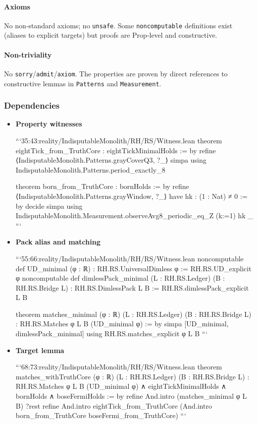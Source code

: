 \documentclass{article}
\begin{document}
\paragraph{Axioms}
No non‑standard axioms; no \texttt{unsafe}. Some \texttt{noncomputable} definitions exist (aliases to explicit targets) but proofs are Prop‑level and constructive.

\paragraph{Non-triviality}
No \texttt{sorry}/\texttt{admit}/\texttt{axiom}. The properties are proven by direct references to constructive lemmas in \texttt{Patterns} and \texttt{Measurement}.

\subsubsection{Dependencies}
\begin{itemize}[leftmargin=*]
  \item \textbf{Property witnesses}

```35:43:reality/IndisputableMonolith/RH/RS/Witness.lean
theorem eightTick_from_TruthCore : eightTickMinimalHolds := by
  refine ⟨IndisputableMonolith.Patterns.grayCoverQ3, ?_⟩
  simpa using IndisputableMonolith.Patterns.period_exactly_8

theorem born_from_TruthCore : bornHolds := by
  refine ⟨IndisputableMonolith.Patterns.grayWindow, ?_⟩
  have hk : (1 : Nat) ≠ 0 := by decide
  simpa using IndisputableMonolith.Measurement.observeAvg8_periodic_eq_Z (k:=1) hk _
```

  \item \textbf{Pack alias and matching}

```55:66:reality/IndisputableMonolith/RH/RS/Witness.lean
noncomputable def UD_minimal (φ : ℝ) : RH.RS.UniversalDimless φ := RH.RS.UD_explicit φ
noncomputable def dimlessPack_minimal (L : RH.RS.Ledger) (B : RH.RS.Bridge L) : RH.RS.DimlessPack L B :=
  RH.RS.dimlessPack_explicit L B

theorem matches_minimal (φ : ℝ) (L : RH.RS.Ledger) (B : RH.RS.Bridge L) :
  RH.RS.Matches φ L B (UD_minimal φ) := by
  simpa [UD_minimal, dimlessPack_minimal] using RH.RS.matches_explicit φ L B
```

  \item \textbf{Target lemma}

```68:73:reality/IndisputableMonolith/RH/RS/Witness.lean
theorem matches_withTruthCore (φ : ℝ) (L : RH.RS.Ledger) (B : RH.RS.Bridge L) :
  RH.RS.Matches φ L B (UD_minimal φ)
  ∧ eightTickMinimalHolds ∧ bornHolds ∧ boseFermiHolds := by
  refine And.intro (matches_minimal φ L B) ?rest
  refine And.intro eightTick_from_TruthCore (And.intro born_from_TruthCore boseFermi_from_TruthCore)
```
\end{itemize}
\end{document}
